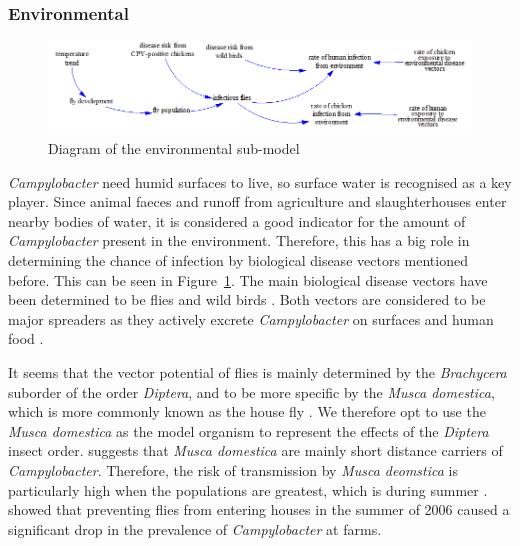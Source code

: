 \subsubsection*{Environmental}

\begin{figure}[!ht]
	\centering
	\includegraphics[width=1\textwidth]{images/environmental_submodel2.png}
	\caption{Diagram of the environmental sub-model}
	\label{fig:environmental_submodel}
\end{figure}

\textit{Campylobacter} need humid surfaces to live, so surface water is recognised as a key player. Since animal faeces and runoff from agriculture and slaughterhouses enter nearby bodies of water, it is considered a good indicator for the amount of \textit{Campylobacter} present in the environment. Therefore, this has a big role in determining the chance of infection by biological disease vectors mentioned before. This can be seen in Figure~\ref{fig:environmental_submodel}. The main biological disease vectors have been determined to be flies and wild birds \parencite{mughini-gras_quantifying_2016}. Both vectors are considered to be major spreaders as they actively excrete \textit{Campylobacter} on surfaces and human food \parencite{french_molecular_2009, hald_influxed_2008, berndtson_campylobacter_1996}.

It seems that the vector potential of flies is mainly determined by the \textit{Brachycera} suborder of the order \textit{Diptera}, and to be more specific by the \textit{Musca domestica}, which is more commonly known as the house fly \parencite{hald_influxed_2008}. We therefore opt to use the \textit{Musca domestica} as the model organism to represent the effects of the \textit{Diptera} insect order. \cite{skovgard_retention_2011} suggests that \textit{Musca domestica} are mainly short distance carriers of \textit{Campylobacter}. Therefore, the risk of transmission by \textit{Musca deomstica} is particularly high when the populations are greatest, which is during summer \parencite{royden_role_2016}. \cite{hald_use_2007} showed that preventing flies from entering houses in the summer of 2006 caused a significant drop in the prevalence of \textit{Campylobacter} at farms.

